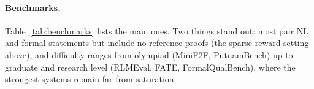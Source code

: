 \documentclass[sigconf,anonymous]{aamas}
\begin{document}

\paragraph{Benchmarks.} Table~\ref{tab:benchmarks} lists the main ones. Two
things stand out: most pair NL and formal statements but include no reference
proofs (the sparse-reward setting above), and difficulty ranges from olympiad
(MiniF2F, PutnamBench) up to graduate and research level (RLMEval, FATE,
FormalQualBench), where the strongest systems remain far from saturation.
\end{document}
